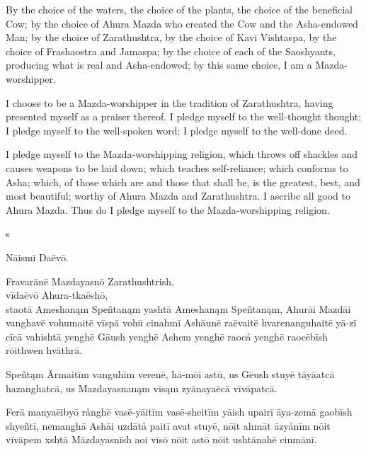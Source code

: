 \documentclass{book}
\begin{document}
\begin{pages}
\begin{Leftside}
By the choice of the waters, the choice of the plants, the choice of the beneficial  Cow; by the choice of Ahura Mazda who created the Cow and the Asha-endowed Man; by the choice of Zarathushtra, by the choice of Kavi Vishtaspa, by the choice of Frashaostra and Jamaspa; by the choice of each of the Saoshyants, producing what is real and Asha-endowed; by this same choice, I am a Mazda-worshipper.

I choose to be a Mazda-worshipper in the tradition of Zarathushtra, having presented myself as a praiser thereof. I pledge myself to the well-thought thought; I pledge myself to the well-spoken word; I pledge myself to the well-done deed.

I pledge myself to the Mazda-worshipping religion, which throws off shackles and causes weapons to be laid down; which teaches self-reliance; which conforms to Asha; which, of those which are and those that shall be, is the greatest, best, and most beautiful; worthy of Ahura Mazda and Zarathushtra. I ascribe all good to Ahura Mazda. Thus do I pledge myself to the Mazda-worshipping religion.

\endnumbering
\end{Leftside}

\begin{Rightside}
\beginnumbering

s
\pend

\pstart
\centerline{Nāismī Daēvō.}
\pend

\numberpstarttrue
\autopar

Fravarānē Mazdayasnō Zarathushtrish,\\
vīdaēvō Ahura-tkaēshō,\\
staotā Ameshanąm Speñtanąm yashtā Ameshanąm Speñtanąm, Ahurāi Mazdāi vanghavē vohumaitē vīspā vohū cinahmī Ashāunē raēvaitē hvarenanguhaitē yā-zī cīcā vahishtā yenghē Gāush yenghē Ashem yenghē raocå yenghē raocēbīsh rōithwen hvāthrā.

Speñtąm Ārmaitīm vanguhīm verenē, hā-mōi astū, us Gēush stuyē tāyāatcā hazanghatcā, us Mazdayasnanąm vīsąm zyānayaēcā vīvāpatcā.

Ferā manyaēibyō rånghē vasē-yāitīm vasē-sheitīm yāish upairī āya-zemā gaobīsh shyeñtī, nemanghā Ashāi uzdātå paitī avat stuyē, nōit ahmāt āzyånīm nōit vīvāpem xshtā Māzdayasnīsh aoi vīsō nōit astō nōit ushtānahē cinmānī. 


\end{Rightside}
\end{pages}
\end{document}
